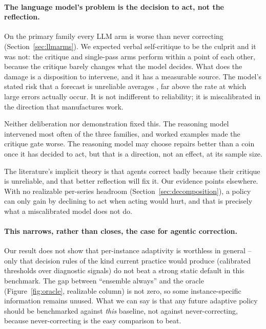 \paragraph{The language model's problem is the decision to act, not the reflection.}
On the primary family every LLM arm is worse than never correcting
(Section~\ref{sec:llmarms}). We expected verbal self-critique to be the culprit and it
was not: the critique and single-pass arms perform within a point of each other, because
the critique barely changes what the model decides. What does the damage is a
disposition to intervene, and it has a measurable source. The model's stated risk that
a forecast is unreliable averages \calLlmMeanRisk{}, far above the rate at which large
errors actually occur. It is not indifferent to reliability; it is miscalibrated in the
direction that manufactures work.

Neither deliberation nor demonstration fixed this. The reasoning model intervened most
often of the three families, and worked examples made the critique gate worse. The
reasoning model may choose repairs better than a coin once it has decided to act, but
that is a direction, not an effect, at its sample size.

The literature's implicit theory is that agents correct badly because their critique is
unreliable, and that better reflection will fix it. Our evidence points elsewhere. With no
realizable per-series headroom (Section~\ref{sec:decomposition}), a policy can only
gain by declining to act when acting would hurt, and that is precisely what a
miscalibrated model does not do.

\paragraph{This narrows, rather than closes, the case for agentic correction.}
Our result does not show that per-instance adaptivity is worthless in general -- only
that decision rules of the kind current practice would produce (calibrated thresholds
over diagnostic signals) do not beat a strong static default in this benchmark. The gap
between ``ensemble always'' and the oracle (Figure~\ref{fig:oracle}, realizable column)
is not zero, so some instance-specific information remains unused. What we can say is
that any future adaptive policy should be benchmarked against \emph{this} baseline, not
against never-correcting, because never-correcting is the easy comparison to beat.

